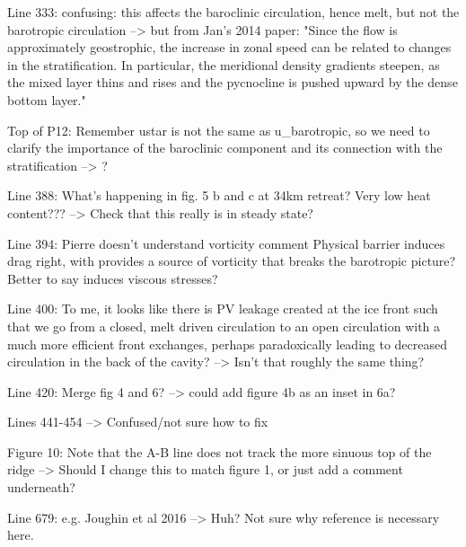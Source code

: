 Line 333: confusing: this affects the baroclinic circulation, hence melt, but not the barotropic circulation
--> but from Jan's 2014 paper: "Since the flow is approximately geostrophic, the increase in zonal
speed can be related to changes in the stratification. In particular, the meridional density gradients steepen, as the mixed layer thins and rises and the pycnocline is pushed upward by the dense bottom layer."

Top of P12: Remember ustar is not the same as u_barotropic, so we need to clarify the importance of the baroclinic component and its connection with the stratification
--> ?

Line 388: What's happening in fig. 5 b and c at 34km retreat? Very low heat content??? 
--> Check that this really is in steady state?

Line 394: Pierre doesn't understand vorticity comment
Physical barrier induces drag right, with provides a source of vorticity that breaks the barotropic picture? Better to say induces viscous stresses?

Line 400: To me, it looks like there is PV leakage created at the ice front such that we go from a closed, melt driven circulation to an open circulation with a much more efficient front exchanges, perhaps paradoxically leading to decreased circulation in the back of the cavity?
--> Isn't that roughly the same thing?

Line 420: Merge fig 4 and 6?
--> could add figure 4b as an inset in 6a?

Lines 441-454
--> Confused/not sure how to fix

Figure 10: Note that the A-B line does not track the more sinuous top of the ridge
--> Should I change this to match figure 1, or just add a comment underneath?

Line 679: e.g. Joughin et al 2016
--> Huh? Not sure why reference is necessary here.

